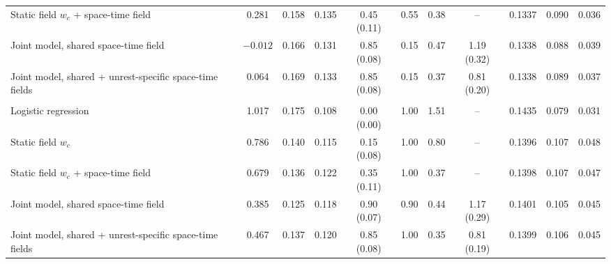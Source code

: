 \begin{tabular}{@{}lcccccccccc@{}}
\quad Static field $w_c$ + space-time field & 0.281 & 0.158 & 0.135 & 0.45 (0.11) & 0.55 & 0.38 & -- & 0.1337 & 0.090 & 0.036 \\
\quad Joint model, shared space-time field & $-0.012$ & 0.166 & 0.131 & 0.85 (0.08) & 0.15 & 0.47 & 1.19 (0.32) & 0.1338 & 0.088 & 0.039 \\
\quad Joint model, shared + unrest-specific space-time fields & 0.064 & 0.169 & 0.133 & 0.85 (0.08) & 0.15 & 0.37 & 0.81 (0.20) & 0.1338 & 0.089 & 0.037 \\
\addlinespace
\multicolumn{11}{@{}l}{\emph{Escalation, $\kappa = 0.4$, with unrest-only episodes}} \\
\quad Logistic regression & 1.017 & 0.175 & 0.108 & 0.00 (0.00) & 1.00 & 1.51 & -- & 0.1435 & 0.079 & 0.031 \\
\quad Static field $w_c$ & 0.786 & 0.140 & 0.115 & 0.15 (0.08) & 1.00 & 0.80 & -- & 0.1396 & 0.107 & 0.048 \\
\quad Static field $w_c$ + space-time field & 0.679 & 0.136 & 0.122 & 0.35 (0.11) & 1.00 & 0.37 & -- & 0.1398 & 0.107 & 0.047 \\
\quad Joint model, shared space-time field & 0.385 & 0.125 & 0.118 & 0.90 (0.07) & 0.90 & 0.44 & 1.17 (0.29) & 0.1401 & 0.105 & 0.045 \\
\quad Joint model, shared + unrest-specific space-time fields & 0.467 & 0.137 & 0.120 & 0.85 (0.08) & 1.00 & 0.35 & 0.81 (0.19) & 0.1399 & 0.106 & 0.045 \\
\bottomrule
\end{tabular}
